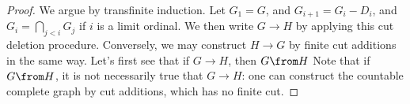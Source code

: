 \documentclass[11pt, a4paper]{memoir}
\theoremstyle{change}
\theoremstyle{plain}
\theoremstyle{nonumberplain}
\newtheorem{proof}{Proof}
\numberwithin{equation}{section}
\begin{document}
\begin{proof}

    We argue by transfinite induction.
    Let $G_1=G$, and $G_{i+1}=G_i-D_i$, and $G_i=\bigcap_{j<i}G_j$ if $i$ is a limit ordinal.
    We then write $G\to H$ by applying this cut deletion procedure.
    Conversely, we may construct $H\to G$ by finite cut additions in the same way.
    Let's first see that if $G\to H$, then $G\from H$
    Note that if $G\from H$, it is not necessarily true that $G\to H$: one can construct the countable complete graph by cut additions, which has no finite cut.

\end{proof}
\end{document}
